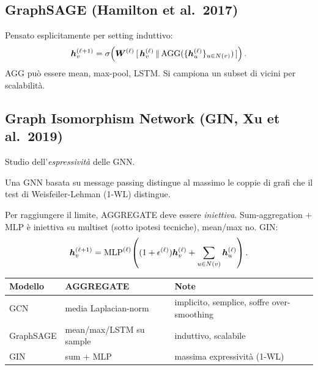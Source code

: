 \subsection{GraphSAGE (Hamilton et al.\ 2017)}
Pensato esplicitamente per setting induttivo:
\[
\bm{h}_v^{(\ell+1)} = \sigma\!\left(\bm{W}^{(\ell)}\, [\,\bm{h}_v^{(\ell)} \,\|\, \mathrm{AGG}(\{\bm{h}_u^{(\ell)}\}_{u\in N(v)})\,]\right).
\]
AGG può essere mean, max-pool, LSTM. Si campiona un subset di vicini per scalabilità.

\subsection{Graph Isomorphism Network (GIN, Xu et al.\ 2019)}
Studio dell'\emph{espressività} delle GNN.

\begin{theorem}
Una GNN basata su message passing distingue al massimo le coppie di grafi che il test di Weisfeiler-Lehman (1-WL) distingue.
\end{theorem}

Per raggiungere il limite, AGGREGATE deve essere \emph{iniettiva}. Sum-aggregation $+$ MLP è iniettiva su multiset (sotto ipotesi tecniche), mean/max no. GIN:
\[
\bm{h}_v^{(\ell+1)} = \mathrm{MLP}^{(\ell)}\!\left((1+\epsilon^{(\ell)})\bm{h}_v^{(\ell)} + \sum_{u\in N(v)} \bm{h}_u^{(\ell)}\right).
\]

\begin{tcolorbox}[mybox, title={GCN vs GraphSAGE vs GIN}]
\begin{tabular}{lll}
\toprule
Modello & AGGREGATE & Note\\
\midrule
GCN & media Laplacian-norm & implicito, semplice, soffre over-smoothing\\
GraphSAGE & mean/max/LSTM su sample & induttivo, scalabile\\
GIN & sum + MLP & massima expressività (1-WL)\\
\bottomrule
\end{tabular}
\end{tcolorbox}

